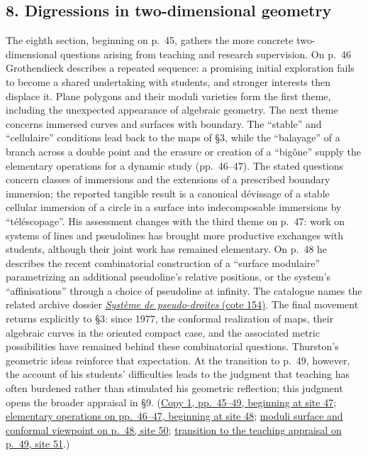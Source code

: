 \documentclass[11pt,a4paper]{article}
\begin{document}
\subsection*{8. Digressions in two-dimensional geometry}
The eighth section, beginning on p.~45, gathers the more concrete
two-dimensional questions arising from teaching and research supervision.
On p.~46 Grothendieck describes a repeated sequence: a promising initial
exploration fails to become a shared undertaking with students, and
stronger interests then displace it. Plane polygons and their moduli
varieties form the first theme, including the unexpected appearance of
algebraic geometry. The next theme concerns immersed curves and surfaces
with boundary. The ``stable'' and ``cellulaire'' conditions lead back to
the maps of \S3, while the ``balayage'' of a branch across a double point
and the erasure or creation of a ``bigône'' supply the elementary
operations for a dynamic study (pp.~46--47). The stated questions concern
classes of immersions and the extensions of a prescribed boundary
immersion; the reported tangible result is a canonical dévissage of a
stable cellular immersion of a circle in a surface into indecomposable
immersions by ``téléscopage''. His assessment changes with
the third theme on p.~47: work on systems of lines and pseudolines has
brought more productive exchanges with students, although their joint
work has remained elementary. On p.~48 he describes the recent
combinatorial construction of a ``surface modulaire'' parametrizing an
additional pseudoline's relative positions, or the system's
``affinisations'' through a choice of pseudoline at infinity. The
catalogue names the related archive dossier
\href{https://grothendieck.umontpellier.fr/archives-grothendieck/}{\emph{Système de pseudo-droites} (cote 154)}.
The final movement returns explicitly to \S3: since 1977, the conformal
realization of maps, their algebraic curves in the oriented compact case,
and the associated metric possibilities have remained behind these
combinatorial questions. Thurston's geometric ideas reinforce that
expectation. At the transition to p.~49, however, the account of his
students' difficulties leads to the judgment that teaching has often
burdened rather than stimulated his geometric reflection; this judgment
opens the broader appraisal in \S9.
(\href{https://grothendieck.umontpellier.fr/web/viewer.html?file=../119.pdf\#page=48}{Copy 1, pp.~45--49, beginning at site 47};
\href{https://grothendieck.umontpellier.fr/web/viewer.html?file=../119.pdf\#page=49}{elementary operations on pp.~46--47, beginning at site 48};
\href{https://grothendieck.umontpellier.fr/web/viewer.html?file=../119.pdf\#page=51}{moduli surface and conformal viewpoint on p.~48, site 50};
\href{https://grothendieck.umontpellier.fr/web/viewer.html?file=../119.pdf\#page=52}{transition to the teaching appraisal on p.~49, site 51}.)
\end{document}
